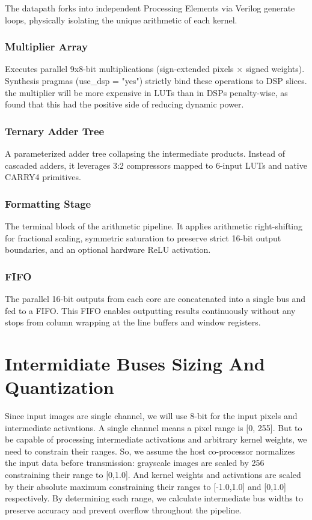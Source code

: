 \documentclass[12pt, a4paper]{article}
\begin{document}
\newpage

The datapath forks into independent Processing Elements via Verilog generate loops, physically isolating the unique arithmetic of each kernel.

\subsubsection{Multiplier Array}
    Executes parallel 9x8-bit multiplications (sign-extended pixels × signed weights). Synthesis pragmas (use\_dsp = "yes") strictly bind these operations to DSP slices. the multiplier will be more expensive in LUTs than in DSPs penalty-wise, as found that this had the positive side of reducing dynamic power.

\subsubsection{Ternary Adder Tree}
    A parameterized adder tree collapsing the intermediate products. Instead of cascaded adders, it leverages 3:2 compressors mapped to 6-input LUTs and native CARRY4 primitives.

\subsubsection{Formatting Stage}
    The terminal block of the arithmetic pipeline. It applies arithmetic right-shifting for fractional scaling, symmetric saturation to preserve strict 16-bit output boundaries, and an optional hardware ReLU activation.

\subsubsection{FIFO}
    The parallel 16-bit outputs from each core are concatenated into a single bus and fed to a FIFO. This FIFO enables outputting results continuously without any stops from column wrapping at the line buffers and window registers.

\newpage

\section{Intermidiate Buses Sizing And Quantization}
    Since input images are single channel, we will use 8-bit for the input pixels and intermediate activations. A single channel means a pixel range is [0, 255]. But to be capable of processing intermediate activations and arbitrary kernel weights, we need to constrain their ranges. So, we assume the host co-processor normalizes the input data before transmission: grayscale images are scaled by 256 constraining their range to [0,1.0]. And kernel weights and activations are scaled by their absolute maximum constraining their ranges to [-1.0,1.0] and [0,1.0] respectively. By determining each range, we calculate intermediate bus widths to preserve accuracy and prevent overflow throughout the pipeline.
\end{document}
